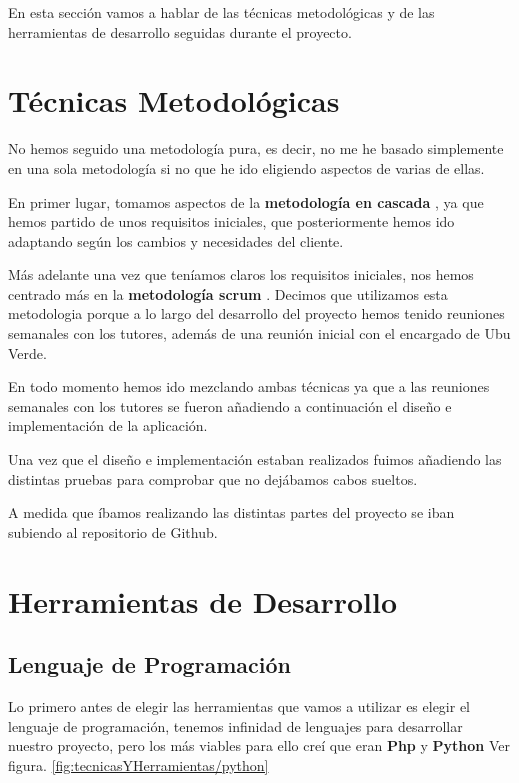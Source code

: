 En esta sección vamos a hablar de las técnicas metodológicas  y de las herramientas de desarrollo seguidas durante el proyecto.

\section{Técnicas Metodológicas}
No hemos seguido una metodología pura, es decir, no me he basado simplemente en una sola metodología si no que he ido eligiendo aspectos de varias de ellas.

En primer lugar, tomamos aspectos de la \textbf{metodología en cascada} \cite{ModeloenCascada}, ya que hemos partido de unos requisitos iniciales, que posteriormente hemos ido adaptando según los cambios y necesidades del cliente.

Más adelante una vez que teníamos claros los requisitos iniciales, nos hemos centrado más en la \textbf{metodología scrum} \cite{MetodologiaScrum}. Decimos que utilizamos esta metodologia porque a lo largo del desarrollo del proyecto hemos tenido reuniones semanales con los tutores, además de una reunión inicial con el encargado de Ubu Verde.

En todo momento hemos ido mezclando ambas técnicas ya que a las reuniones semanales con los tutores se fueron añadiendo a continuación el diseño e implementación de la aplicación.

Una vez que el diseño e implementación estaban realizados fuimos añadiendo las distintas pruebas para comprobar que no dejábamos cabos sueltos.

A medida que íbamos realizando las distintas partes del proyecto se iban subiendo al repositorio de Github.

\section{Herramientas de Desarrollo}

\subsection{Lenguaje de Programación}
Lo primero antes de elegir las herramientas que vamos a utilizar es elegir el lenguaje de programación, tenemos infinidad de lenguajes para desarrollar nuestro proyecto, pero los más viables para ello creí que eran \textbf{Php} \cite{Php} y \textbf{Python} \cite{Python} Ver figura. \ref{fig:tecnicasYHerramientas/python}


